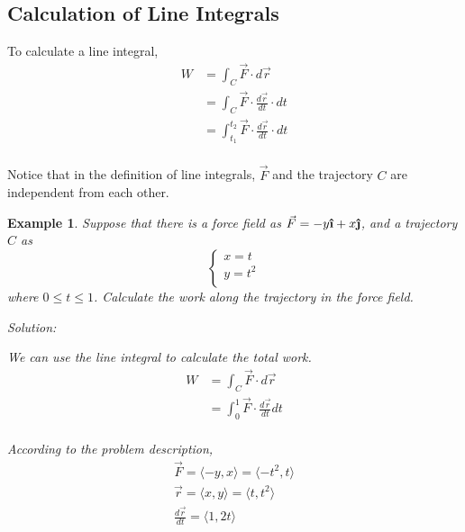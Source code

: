 \documentclass{article}
\newtheorem{example}{Example}
\newcommand{\uvec}[1]{\boldsymbol{\hat{\textbf{#1}}}}
\begin{document}
\subsection{Calculation of Line Integrals}

To calculate a line integral,
\begin{equation*}
  \begin{split}
    W &= \int_C \vec{F} \cdot d\vec{r} \\
      &= \int_C \vec{F} \cdot \frac{d\vec{r}}{dt} \cdot dt \\
      &= \int_{t_1}^{t_2} \vec{F} \cdot \frac{d\vec{r}}{dt} \cdot dt \\
  \end{split}
\end{equation*}

Notice that in the definition of line integrals, $\vec{F}$ and the trajectory 
$C$ are independent from each other.

\begin{example}
  Suppose that there is a force field as $\vec{F} = -y \uvec{\i} + x \uvec{\j}$, 
  and a trajectory $C$ as
  \begin{equation*}
    \begin{cases}
      x = t \\
      y = t^2 \\
    \end{cases}
  \end{equation*}
  where $0 \leq t \leq 1$. Calculate the work along the trajectory in the force 
  field.

  Solution:

  We can use the line integral to calculate the total work.
  \begin{equation*}
    \begin{split}
      W &= \int_C \vec{F} \cdot d\vec{r} \\
        &= \int_0^1 \vec{F} \cdot \frac{d\vec{r}}{dt} dt \\
    \end{split}
  \end{equation*}

  According to the problem description,
  \begin{gather*}
    \vec{F} = \langle -y, x \rangle = \langle -t^2, t \rangle \\
    \vec{r} = \langle x, y \rangle = \langle t, t^2 \rangle \\
    \frac{d\vec{r}}{dt} = \langle 1, 2t \rangle \\
  \end{gather*}
\end{example}
\end{document}
